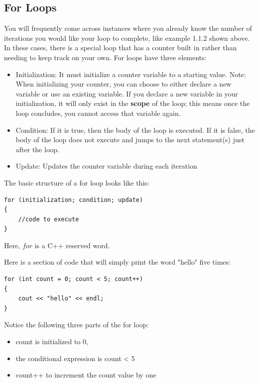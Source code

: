 \subsection{For Loops}
You will frequently come across instances where you already know the number of iterations you would like your loop to complete, like example 1.1.2 shown above. In these cases, there is a special loop that has a counter built in rather than needing to keep track on your own. For loops have three elements:
\begin{itemize}
    \item Initialization: It must initialize a counter variable to a starting value. Note: When initializing your counter, you can choose to either declare a new variable or use an existing variable. If you declare a new variable in your initialization, it will only exist in the \textbf{scope} of the loop; this means once the loop concludes, you cannot access that variable again. 
    \item Condition: If it is true, then the body of the loop is executed. If it is false, the body of the loop does not execute and jumps to the next statement(s) just after the loop.
    \item Update: Updates the counter variable during each iteration
\end{itemize}

The basic structure of a for loop looks like this:

\begin{verbatim}
for (initialization; condition; update)
{
    //code to execute
}
\end{verbatim}

Here, $for$ is a C++ reserved word. 

\begin{example}
    Here is a section of code that will simply print the word "hello" five times:
    \begin{verbatim}
for (int count = 0; count < 5; count++)
{
	cout << "hello" << endl;
}
    \end{verbatim}
    Notice the following three parts of the for loop:

    \begin{itemize}
        \item count is initialized to 0,
        \item the conditional expression is count < 5
        \item count++ to increment the count value by one
    \end{itemize}

\end{example}

